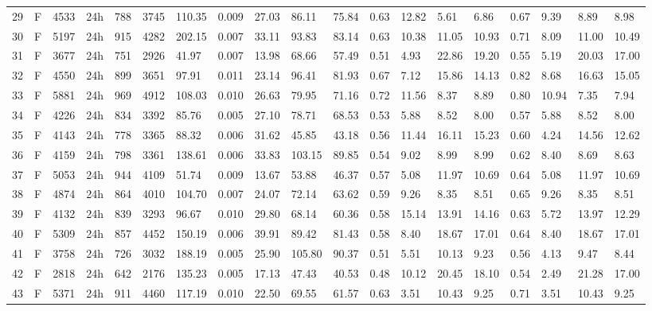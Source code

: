 \begin{tabular}{rllllllrlllllllllll}
29 & F & 4533 & 24h & 788 & 3745 & 110.35 & 0.009 & 27.03 & 86.11 & 75.84 & 0.63 & 12.82 & 5.61 & 6.86 & 0.67 & 9.39 & 8.89 & 8.98 \\
30 & F & 5197 & 24h & 915 & 4282 & 202.15 & 0.007 & 33.11 & 93.83 & 83.14 & 0.63 & 10.38 & 11.05 & 10.93 & 0.71 & 8.09 & 11.00 & 10.49 \\
31 & F & 3677 & 24h & 751 & 2926 & 41.97 & 0.007 & 13.98 & 68.66 & 57.49 & 0.51 & 4.93 & 22.86 & 19.20 & 0.55 & 5.19 & 20.03 & 17.00 \\
32 & F & 4550 & 24h & 899 & 3651 & 97.91 & 0.011 & 23.14 & 96.41 & 81.93 & 0.67 & 7.12 & 15.86 & 14.13 & 0.82 & 8.68 & 16.63 & 15.05 \\
33 & F & 5881 & 24h & 969 & 4912 & 108.03 & 0.010 & 26.63 & 79.95 & 71.16 & 0.72 & 11.56 & 8.37 & 8.89 & 0.80 & 10.94 & 7.35 & 7.94 \\
34 & F & 4226 & 24h & 834 & 3392 & 85.76 & 0.005 & 27.10 & 78.71 & 68.53 & 0.53 & 5.88 & 8.52 & 8.00 & 0.57 & 5.88 & 8.52 & 8.00 \\
35 & F & 4143 & 24h & 778 & 3365 & 88.32 & 0.006 & 31.62 & 45.85 & 43.18 & 0.56 & 11.44 & 16.11 & 15.23 & 0.60 & 4.24 & 14.56 & 12.62 \\
36 & F & 4159 & 24h & 798 & 3361 & 138.61 & 0.006 & 33.83 & 103.15 & 89.85 & 0.54 & 9.02 & 8.99 & 8.99 & 0.62 & 8.40 & 8.69 & 8.63 \\
37 & F & 5053 & 24h & 944 & 4109 & 51.74 & 0.009 & 13.67 & 53.88 & 46.37 & 0.57 & 5.08 & 11.97 & 10.69 & 0.64 & 5.08 & 11.97 & 10.69 \\
38 & F & 4874 & 24h & 864 & 4010 & 104.70 & 0.007 & 24.07 & 72.14 & 63.62 & 0.59 & 9.26 & 8.35 & 8.51 & 0.65 & 9.26 & 8.35 & 8.51 \\
39 & F & 4132 & 24h & 839 & 3293 & 96.67 & 0.010 & 29.80 & 68.14 & 60.36 & 0.58 & 15.14 & 13.91 & 14.16 & 0.63 & 5.72 & 13.97 & 12.29 \\
40 & F & 5309 & 24h & 857 & 4452 & 150.19 & 0.006 & 39.91 & 89.42 & 81.43 & 0.58 & 8.40 & 18.67 & 17.01 & 0.64 & 8.40 & 18.67 & 17.01 \\
41 & F & 3758 & 24h & 726 & 3032 & 188.19 & 0.005 & 25.90 & 105.80 & 90.37 & 0.51 & 5.51 & 10.13 & 9.23 & 0.56 & 4.13 & 9.47 & 8.44 \\
42 & F & 2818 & 24h & 642 & 2176 & 135.23 & 0.005 & 17.13 & 47.43 & 40.53 & 0.48 & 10.12 & 20.45 & 18.10 & 0.54 & 2.49 & 21.28 & 17.00 \\
43 & F & 5371 & 24h & 911 & 4460 & 117.19 & 0.010 & 22.50 & 69.55 & 61.57 & 0.63 & 3.51 & 10.43 & 9.25 & 0.71 & 3.51 & 10.43 & 9.25 \\

\end{tabular}
